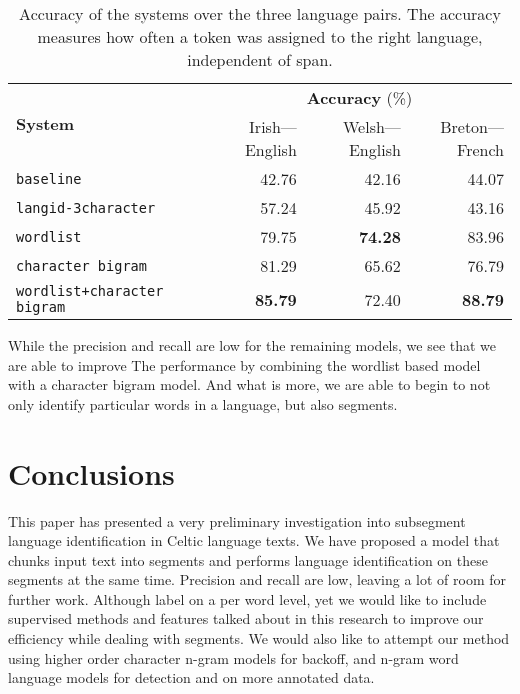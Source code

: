 \documentclass[11pt]{article}
\begin{document}
\begin{table}
\begin{center}
\begin{tabular}{|l|r|r|r|}
\hline
\multirow{2}{*}{\textbf{System}} &  \multicolumn{3}{c|}{\textbf{Accuracy} (\%)} \\\cline{2-4}
       &   Irish---English & Welsh---English & Breton---French \\ 
\hline
\texttt{baseline} & 42.76 & 42.16 & 44.07 \\
\hline
\texttt{langid-3character} & 57.24 & 45.92 & 43.16 \\
\hline
\texttt{wordlist} & 79.75 & \textbf{74.28} & 83.96 \\
\hline
\texttt{character bigram} & 81.29 & 65.62 & 76.79 \\
\hline
\texttt{wordlist+character bigram} & \textbf{85.79} & 72.40 & \textbf{88.79} \\
\hline
\end{tabular}
\end{center}
\caption{Accuracy of the systems over the three language pairs. The accuracy measures how often a token
  was assigned to the right language, independent of span.}
\label{table:accuracy}
\end{table}
While the precision and recall are low for the remaining models, we see that we are able to improve 
The performance by combining the wordlist based model with a character bigram model. And what is more, we are able to begin to not only 
identify particular words in a language, but also segments.

\vspace{-0.132cm}
\section{Conclusions}
\vspace{-0.132cm}
\label{sec:conclusions}

This paper has presented a very preliminary investigation into subsegment language identification in Celtic language texts. We have
proposed a model that chunks input text into segments and performs language identification on these segments at the same time. Precision and
recall are low, leaving a lot of room for further work.
 Although  label on a per word level, yet we would like to include supervised methods and features talked about in this research to improve our efficiency while dealing with segments. We would also like to attempt our method using higher order character n-gram models for backoff, and n-gram word language models for detection and on more annotated data. 
\end{document}
